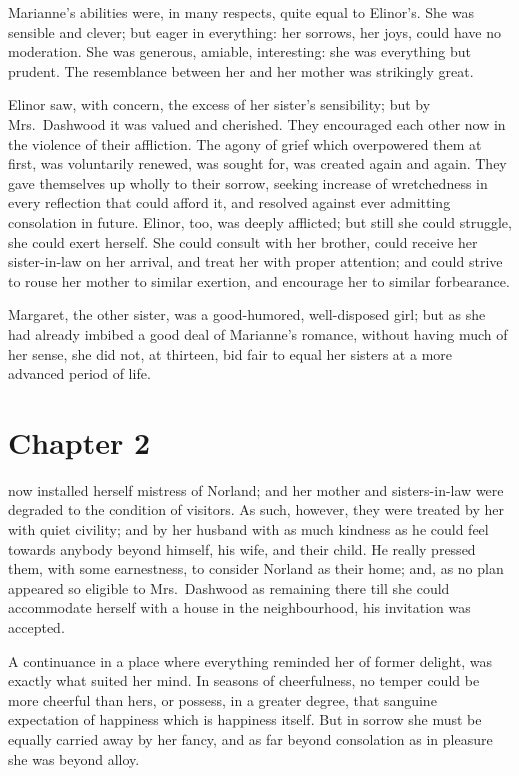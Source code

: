 Marianne's abilities were, in many respects,
quite equal to Elinor's. She was sensible and clever;
but eager in everything: her sorrows, her joys, could have
no moderation.  She was generous, amiable, interesting: she
was everything but prudent.  The resemblance between
her and her mother was strikingly great.

Elinor saw, with concern, the excess of her
sister's sensibility; but by Mrs.\ Dashwood it was valued
and cherished.  They encouraged each other now in the
violence of their affliction.  The agony of grief
which overpowered them at first, was voluntarily renewed,
was sought for, was created again and again.  They gave
themselves up wholly to their sorrow, seeking increase
of wretchedness in every reflection that could afford it,
and resolved against ever admitting consolation
in future.  Elinor, too, was deeply afflicted; but still
she could struggle, she could exert herself.  She could
consult with her brother, could receive her sister-in-law
on her arrival, and treat her with proper attention;
and could strive to rouse her mother to similar exertion,
and encourage her to similar forbearance.

Margaret, the other sister, was a good-humored,
well-disposed girl; but as she had already imbibed
a good deal of Marianne's romance, without having
much of her sense, she did not, at thirteen, bid fair
to equal her sisters at a more advanced period of life.



\chapter{Chapter 2}


 now installed herself mistress
of Norland; and her mother and sisters-in-law were degraded
to the condition of visitors.  As such, however, they were
treated by her with quiet civility; and by her husband
with as much kindness as he could feel towards anybody
beyond himself, his wife, and their child.  He really
pressed them, with some earnestness, to consider Norland
as their home; and, as no plan appeared so eligible
to Mrs.\ Dashwood as remaining there till she could
accommodate herself with a house in the neighbourhood,
his invitation was accepted.

A continuance in a place where everything reminded
her of former delight, was exactly what suited her mind.
In seasons of cheerfulness, no temper could be more cheerful
than hers, or possess, in a greater degree, that sanguine
expectation of happiness which is happiness itself.
But in sorrow she must be equally carried away by her fancy,
and as far beyond consolation as in pleasure she was
beyond alloy.

